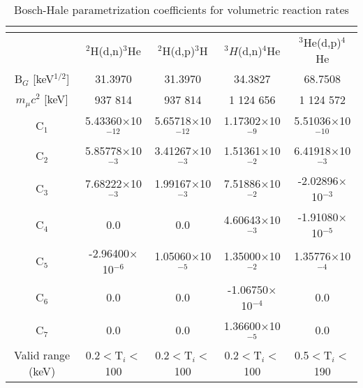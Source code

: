 \begin{table}[h!]\small
  \noindent
  \centering
  \caption{Bosch-Hale parametrization coefficients for volumetric reaction rates}
  \begin{tabular}{c | c c | c | c}
    \multicolumn{5}{c}{}\\
    \hline
    & $^2$H(d,n)$^3$He & $^2$H(d,p)$^3$H & $^3H$(d,n)$^4$He & $^3$He(d,p)$^4$He\\
    \hline\hline
    B$_G$ [keV$^{1/2}$] & 31.3970 & 31.3970 & 34.3827   & 68.7508 \\
    $m_\mu c^2$ [keV]   & 937 814 & 937 814 & 1 124 656 & 1 124 572 \\
    \hline
    C$_1$& 5.43360$\times$10$^{-12}$  & 5.65718$\times$10$^{-12}$ & 1.17302$\times$10$^{-9}$  & 5.51036$\times$10$^{-10}$ \\ 
    C$_2$  & 5.85778$\times$10$^{-3}$   & 3.41267$\times$10$^{-3}$  & 1.51361$\times$10$^{-2}$  & 6.41918$\times$10$^{-3}$ \\
    C$_3$  & 7.68222$\times$10$^{-3}$   & 1.99167$\times$10$^{-3}$  & 7.51886$\times$10$^{-2}$  & -2.02896$\times$10$^{-3}$ \\
    C$_4$  & 0.0                        & 0.0                       & 4.60643$\times$10$^{-3}$  & -1.91080$\times$10$^{-5}$ \\
    C$_5$  & -2.96400$\times$10$^{-6}$  & 1.05060$\times$10$^{-5}$  & 1.35000$\times$10$^{-2}$  & 1.35776$\times$10$^{-4}$ \\
    C$_6$  & 0.0                        & 0.0                       & -1.06750$\times$10$^{-4}$ & 0.0 \\
    C$_7$& 0.0                      & 0.0                       & 1.36600$\times$10$^{-5}$  & 0.0 \\
    \hline
    Valid range (keV) & 0.2$<$T$_i<$100 & 0.2$<$T$_i<$100 & 0.2$<$T$_i<$100 & 0.5$<$T$_i<$190\\
    \hline
  \end{tabular}
  \label{table:rrParam}
\end{table}

